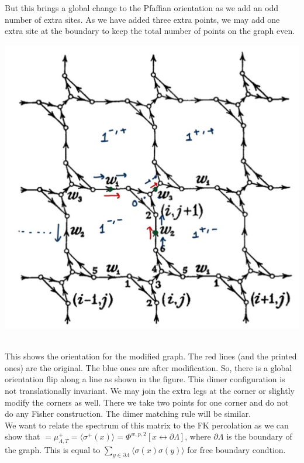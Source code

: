 \documentclass{article}
\begin{document}
     \vspace{0.5 cm}
     \pagebreak
     But this brings a global change to the Pfaffian orientation as we add an odd number of extra sites. As we have added three extra points, we may add one extra site at the boundary to keep the total number of points on the graph even.\\ 
     
     
     \begin{center}
     	\includegraphics[scale=0.2]{pfaff mod.jpg}
     \end{center}\\

     
     This shows the orientation for the modified graph. The red lines (and the printed ones) are the original. The blue ones are after modification. So, there is a global orientation flip along a line as shown in the figure. This dimer configuration is not translationally invariant. We may join the extra legs at the corner or slightly modify the corners as well. There we take two points for one corner and do not do any Fisher construction. The dimer matching rule will be similar.\\ 
     
     We want to relate the spectrum of this matrix to the FK percolation as we can show that $=\mu^{+}_{\Lambda , T}=\langle{\sigma^{+}(x)}\rangle=\Phi^{w,p,2}[x \leftrightarrow \partial \Lambda ]$, where $\partial \Lambda$ is the boundary of the graph. This is equal to $\sum_{y \in \partial \Lambda} \langle{\sigma(x)\sigma(y)}\rangle$ for free boundary condtion.\\
     
\end{document}
